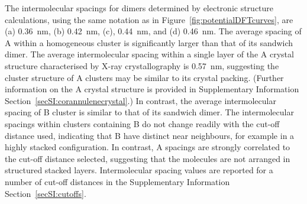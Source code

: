 The intermolecular spacings for dimers determined by electronic structure calculations, using the same notation as in Figure~\ref{fig:potentialDFTcurves}, are (a) 0.36~nm, (b) 0.42~nm, (c), 0.44~nm, and (d) 0.46~nm. The average spacing of A within a homogeneous cluster is significantly larger than that of its sandwich dimer. The average intermolecular spacing within a single layer of the A crystal structure characterised by X-ray crystallography is 0.57~nm, suggesting the cluster structure of A clusters may be similar to its crystal packing. (Further information on the A crystal structure is provided in Supplementary Information Section~\ref{secSI:corannulenecrystal}.) In contrast, the average intermolecular spacing of B cluster is similar to that of its sandwich dimer. The intermolecular spacings within clusters containing B do not change readily with the cut-off distance used, indicating that B have distinct near neighbours, for example in a highly stacked configuration. In contrast, A spacings are strongly correlated to the cut-off distance selected, suggesting that the molecules are not arranged in structured stacked layers. Intermolecular spacing values are reported for a number of cut-off distances in the Supplementary Information Section~\ref{secSI:cutoffs}.

